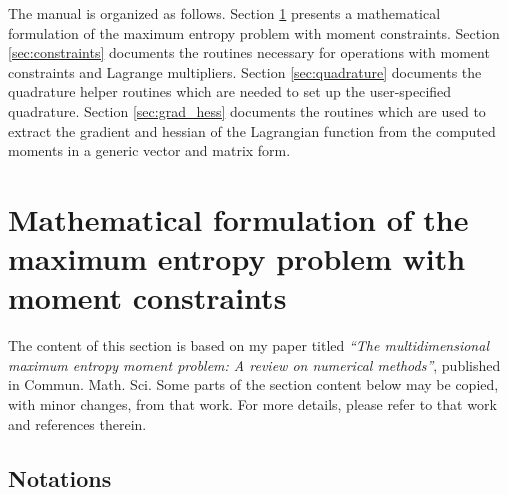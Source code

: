 \documentclass[12pt]{amsart}
\numberwithin{equation}{section}
\begin{document}
The manual is organized as follows. Section \ref{sec:math} presents a
mathematical formulation of the maximum entropy problem with moment
constraints. Section \ref{sec:constraints} documents the routines
necessary for operations with moment constraints and Lagrange
multipliers. Section \ref{sec:quadrature} documents the quadrature
helper routines which are needed to set up the user-specified
quadrature. Section \ref{sec:grad_hess} documents the routines which
are used to extract the gradient and hessian of the Lagrangian
function from the computed moments in a generic vector and matrix
form.

\section{Mathematical formulation of the maximum entropy problem
with moment constraints}
\label{sec:math}

The content of this section is based on my paper titled {\em ``The
  multidimensional maximum entropy moment problem: A review on
  numerical methods''}, published in Commun. Math. Sci. Some parts of
the section content below may be copied, with minor changes, from that
work. For more details, please refer to that work and references
therein.

\subsection{Notations}
\end{document}
